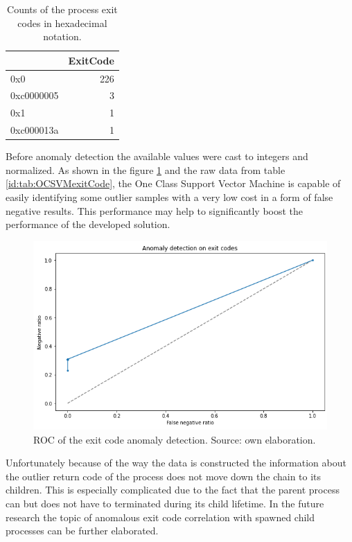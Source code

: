 \documentclass[a4paper,twoside,12pt]{book}
\begin{document}
\begin{table}
	\centering
	\caption{Counts of the process exit codes in hexadecimal notation.}
	\label{id:tab:exitCodeCounts}
	\begin{tabular}{lr}
		\toprule
		{} &  ExitCode \\
		\midrule
		0x0        &       226 \\
		0xc0000005 &         3 \\
		0x1        &         1 \\
		0xc000013a &         1 \\
		\bottomrule
	\end{tabular}		
\end{table}

Before anomaly detection the available values were cast to integers and normalized.
As shown in the figure \ref{fig:exitCodeROC} and the raw data from table \ref{id:tab:OCSVMexitCode},  
the One Class Support Vector Machine is capable of easily identifying some outlier 
samples with a very low cost in a form of false negative results. This performance may help to
significantly boost the performance of the developed solution. 

\begin{figure}
	\centering
	\includegraphics[scale=0.9]{images/ExitCodeROC}
	\caption{ROC of the exit code anomaly detection. Source: own elaboration.}
	\label{fig:exitCodeROC}
 \end{figure}

Unfortunately because of the way the data is constructed the information about the outlier return code of the 
process does not move down the chain to its children. This is especially complicated due to the fact that the parent process
can but does not have to terminated during its child lifetime. In the future research the topic of anomalous exit
code correlation with spawned child processes can be further elaborated.
\end{document}
